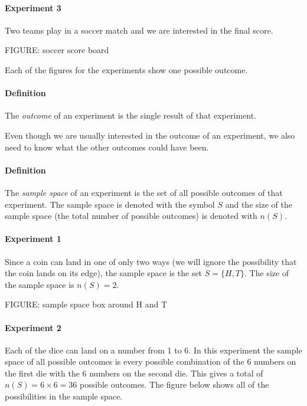 \documentclass[a4paper,11pt]{report}
\begin{document}
\paragraph{Experiment 3} Two teams play in a soccer match and we are
interested in the final score.

FIGURE: soccer score board

Each of the figures for the experiments show one possible outcome.

\paragraph{Definition} The {\em outcome} of an experiment is the single
result of that experiment.

Even though we are usually interested in the outcome of an experiment,
we also need to know what the other outcomes could have been.

\paragraph{Definition} The {\em sample space} of an experiment is the
set of all possible outcomes of that experiment. The sample space is
denoted with the symbol \(S\) and the size of the sample space (the
total number of possible outcomes) is denoted with \(n(S)\).

\paragraph{Experiment 1} Since a coin can land in one of only two ways
(we will ignore the possibility that the coin lands on its edge), the
sample space is the set \(S=\{H, T\}\). The size of the sample space
is \(n(S)=2\).

FIGURE: sample space box around H and T

\paragraph{Experiment 2} Each of the dice can land on a number from 1
to 6. In this experiment the sample space of all possible outcomes is
every possible combination of the 6 numbers on the first die with the
6 numbers on the second die. This gives a total of \(n(S) = 6 \times 6 = 36\)
possible outcomes. The figure below shows all of the possibilities in
the sample space.

\begin{center}
\end{center}
\end{document}

